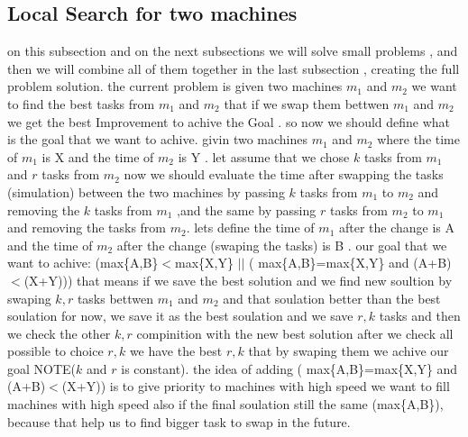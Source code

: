 \documentclass[11pt,fullpage]{article}
\begin{document}
\subsection{Local Search for two machines}
on this subsection and on the next subsections we will solve small problems , and then we will combine all of them together in the last subsection , creating the full problem solution. \newline
the current problem is given two machines $m_1$  and $m_2$ we want to find the best tasks from $m_1$  and $m_2$   that if we
swap them bettwen  $m_1$  and $m_2$  we get the best Improvement to achive the Goal . so now we should define what is the goal that we want to achive.\newline
givin two machines   $m_1$  and $m_2$ where the time of $m_1$ is X and the time of $m_2$ is Y . let assume that we chose $k$ tasks from $m_1$ and $r$ tasks from $m_2$  now we should evaluate the time after swapping the tasks (simulation) between the two machines by passing $k$ tasks from $m_1$ to $m_2$ and removing the $k$ tasks from $m_1$ ,and the same by passing $r$ tasks from $m_2$ to $m_1$ and removing the tasks from $m_2$. lets define the time of $m_1$ after the change is A and the time of $m_2$ after the change (swaping the tasks) is B .  our goal that we want to achive:\newline
 (max\{A,B\}$<$max\{X,Y\} $ ||$ ( max\{A,B\}=max\{X,Y\}  and (A+B)$<$(X+Y))) \newline
that means if we save the best solution and we find new soultion by swaping $k , r$ tasks bettwen $m_1$ and $m_2$ and that soulation  better than the best soulation for now, we save it as the best soulation and we save $r, k$ tasks and then we check the other $k, r$ compinition with the
new best solution after we check all possible to choice  $r, k$ we have the best $r,k$ that by swaping them we achive our goal NOTE($k $ and $ r$ is constant).\newline
the idea of adding ( max\{A,B\}=max\{X,Y\}  and (A+B)$<$(X+Y)) is to give priority to machines with high speed we want to fill machines with high speed also 
if the final soulation still the same (max\{A,B\}), because that help us to find bigger task to swap in the future.
\end{document}
